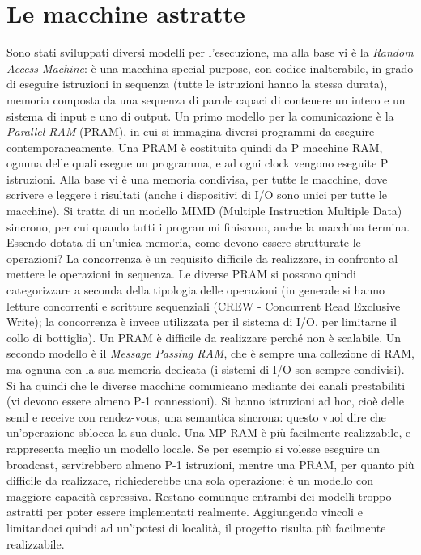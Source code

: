 \section{Le macchine astratte}
Sono stati sviluppati diversi modelli per l'esecuzione, ma alla base vi è la
\textit{Random Access Machine}: è una macchina special purpose, con codice
inalterabile, in grado di eseguire istruzioni in sequenza (tutte le istruzioni
hanno la stessa durata), memoria composta da una sequenza di parole capaci di
contenere un intero e un sistema di input e uno di output.
Un primo modello per la comunicazione è la \textit{Parallel RAM} (PRAM), in cui
si immagina diversi programmi da eseguire contemporaneamente. Una PRAM è
costituita quindi da P macchine RAM, ognuna delle quali esegue un programma, e
ad ogni clock vengono eseguite P istruzioni. Alla base vi è una memoria
condivisa, per tutte le macchine, dove scrivere e leggere i risultati (anche i
dispositivi di I/O sono unici per tutte le macchine). Si tratta di un modello
MIMD (Multiple Instruction Multiple Data) sincrono, per cui quando tutti i
programmi finiscono, anche la macchina termina. Essendo dotata di un'unica
memoria, come devono essere strutturate le operazioni? La concorrenza è un
requisito difficile da realizzare, in confronto al mettere le operazioni in
sequenza. Le diverse PRAM si possono quindi categorizzare a seconda della
tipologia delle operazioni (in generale si hanno letture concorrenti e scritture
sequenziali (CREW - Concurrent Read Exclusive Write); la concorrenza è invece
utilizzata per il sistema di I/O, per limitarne il collo di bottiglia). Un PRAM
è difficile da realizzare perché non è scalabile.
Un secondo modello è il \textit{Message Passing RAM}, che è sempre una
collezione di RAM, ma ognuna con la sua memoria dedicata (i sistemi di I/O son
sempre condivisi). Si ha quindi che le diverse macchine comunicano mediante dei
canali prestabiliti (vi devono essere almeno P-1 connessioni). Si hanno
istruzioni ad hoc, cioè delle send e receive con rendez-vous, una semantica
sincrona: questo vuol dire che un'operazione sblocca la sua duale. Una MP-RAM è
più facilmente realizzabile, e rappresenta meglio un modello locale. Se per
esempio si volesse eseguire un broadcast,
servirebbero almeno P-1 istruzioni, mentre una PRAM, per quanto più difficile
da realizzare, richiederebbe una sola operazione: è un modello con maggiore
capacità espressiva. Restano comunque entrambi dei modelli troppo astratti per
poter essere implementati realmente. Aggiungendo vincoli e limitandoci quindi ad un'ipotesi di località, il progetto
risulta più facilmente realizzabile.
